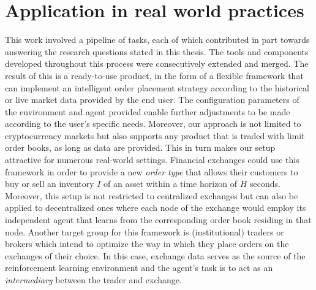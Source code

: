 \section{Application in real world practices}

This work involved a pipeline of tasks, each of which contributed in part towards answering the research questions stated in this thesis.
The tools and components developed throughout this process were consecutively extended and merged.
The result of this is a ready-to-use product, in the form of a flexible framework that can implement an intelligent order placement strategy according to the historical or live market data provided by the end user.
The configuration parameters of the environment and agent provided enable further adjustments to be made according to the user's specific needs.
Moreover, our approach is not limited to cryptocurrency markets but also supports any product that is traded with limit order books, as long as data are provided.
This in turn makes our setup attractive for numerous real-world settings.
Financial exchanges could use this framework in order to provide a new \textit{order type} that allows their customers to buy or sell an inventory $I$ of an asset within a time horizon of $H$ seconds.
Moreover, this setup is not restricted to centralized exchanges but can also be applied to decentralized ones where each node of the exchange would employ its independent agent that learns from the corresponding order book residing in that node.
Another target group for this framework is (institutional) traders or brokers which intend to optimize the way in which they place orders on the exchanges of their choice.
In this case, exchange data serves as the source of the reinforcement learning environment and the agent's task is to act as an \textit{intermediary} between the trader and exchange.